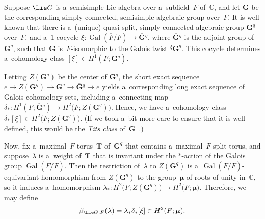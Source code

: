 \documentclass[pdftex]{sigma}
\DeclareMathOperator{\Gal}{Gal}
\numberwithin{equation}{section}
\begin{document}
\begin{defn} \label{BetaDefn}
Suppose $\Lie G$ is a~semisimple Lie algebra over a~subf\/ield~$F$ of~$\mathbb{C}$, and let $\mathbf{G}$ be the
corresponding simply connected, semisimple algebraic group over~$F$.
It is well known that there is a~(unique) quasi-split, simply connected algebraic group $\mathbf{G}^q$ over~$F$, and
a~$1$-cocycle $\xi \colon \Gal(\overline{F}/F) \to \overline{\mathbf{G}}{}^q$, where $\overline{\mathbf{G}}{}^q$ is the
adjoint group of~$\mathbf{G}^q$, such that $\mathbf{G}$ is~$F$-isomorphic to the Galois twist ${}^\xi \mathbf{G}^q$.
This cocycle determines a~cohomology class $[\xi] \in H^1(F; \overline{\mathbf{G}}{}^q)$.

Letting $Z(\mathbf{G}^q)$ be the center of $\mathbf{G}^q$, the short exact sequence $ e \to Z(\mathbf{G}^q) \to
\mathbf{G}^q \to \overline{\mathbf{G}}{}^q \to e $ yields a~corresponding long exact sequence of Galois cohomology sets,
including a~connecting map $\delta_* \colon H^1(F; \overline{\mathbf{G}}{}^q) \to H^2\bigl(F; Z(\mathbf{G}^q) \bigr)$.
Hence, we have a~cohomology class $\delta_* [\xi] \in H^2\bigl(F; Z(\mathbf{G}^q) \bigr)$.
(If we took a~bit more care to ensure that it is well-def\/ined, this would be the \emph{Tits class}
of~$\mathbf{G}$~\cite[p.~426]{KnusEtAl-BookOfInvols}.)

Now, f\/ix a~maximal~$F$-torus~$\mathbf{T}$ of~$\mathbf{G}^q$ that contains a~maximal~$F$-split torus, and
suppose~$\lambda$ is a~weight of~$\mathbf{T}$ that is invariant under the $*$-action of the Galois group $\Gal(\overline{F}/F)$.
Then the restriction of~$\lambda$ to $Z(\mathbf{G}^q)$ is a~$\Gal(\overline{F}/F)$-equivariant homomorphism from
$Z(\mathbf{G}^q)$ to the group~$\boldsymbol\mu$ of roots of unity in~$\mathbb{C}$, so it induces a~homomorphism
$\lambda_* \colon H^2\bigl(F; Z(\mathbf{G}^q) \bigr) \to H^2\bigl(F; \boldsymbol\mu \bigr)$.
Therefore, we may def\/ine
\begin{gather*}
\beta_{\Lie G,F}(\lambda) = \lambda_* \delta_* [\xi] \in H^2(F; \boldsymbol\mu).
\end{gather*}
\end{defn}
\end{document}
